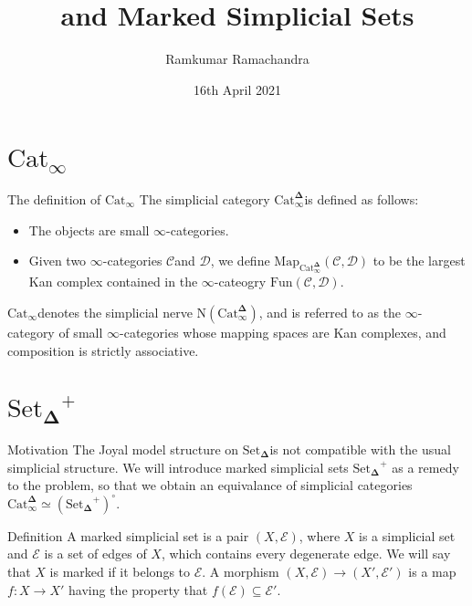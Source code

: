 \documentclass{beamer}[9pt]
\title{\texorpdfstring{\Catinf}{Cat∞} and Marked Simplicial Sets}
\author{Ramkumar Ramachandra}
\date{16th April 2021}
\institute{Université de Paris}
\newcommand{\8}{\ensuremath{\infty}}
\newcommand{\C}{\ensuremath{\mathscr{C}}}
\newcommand{\D}{\ensuremath{\mathscr{D}}}
\newcommand{\SSet}{\ensuremath{\text{Set}_{\boldsymbol{\Delta}}}}
\newcommand{\Catinfdel}{\ensuremath{\text{Cat}^{\boldsymbol{\Delta}}_{\infty}}}
\newcommand{\Catinf}{\ensuremath{\text{Cat}_{\infty}}}
\newcommand{\Map}{\ensuremath{\text{Map}}}
\newcommand{\Fun}{\ensuremath{\text{Fun}}}
\begin{document}
\begin{frame}
  \titlepage
\end{frame}

\section{\texorpdfstring{\Catinf}{Cat∞}}

\begin{frame}{The definition of \texorpdfstring{\Catinf}{Cat∞}}
  The simplicial category \Catinfdel is defined as follows:
  \begin{itemize}
    \item The objects are small \8-categories.
    \item Given two \8-categories \C and \D, we define $\Map_{\Catinfdel}(\C, \D)$ to be the largest Kan complex contained in the \8-cateogry $\Fun(\C, \D)$.
  \end{itemize}

  \Catinf denotes the simplicial nerve $\text{N}(\Catinfdel)$, and is referred to as the \8-category of small \8-categories whose mapping spaces are Kan complexes, and composition is strictly associative.
\end{frame}

\section{\texorpdfstring{$\SSet^+$}{Marked simplicial sets}}

\begin{frame}{Motivation}
  The Joyal model structure on \SSet is not compatible with the usual simplicial structure. We will introduce marked simplicial sets $\SSet^+$ as a remedy to the problem, so that we obtain an equivalance of simplicial categories $\Catinfdel \simeq (\SSet^+)^\circ$.
\end{frame}

\begin{frame}{Definition}
  A marked simplicial set is a pair $(X, \mathcal{E})$, where $X$ is a simplicial set and $\mathcal{E}$ is a set of edges of $X$, which contains every degenerate edge. We will say that $X$ is marked if it belongs to $\mathcal{E}$. A morphism $(X, \mathcal{E}) \rightarrow (X', \mathcal{E}')$ is a map $f : X \rightarrow X'$ having the property that $f(\mathcal{E}) \subseteq \mathcal{E}'$.
\end{frame}
\end{document}
